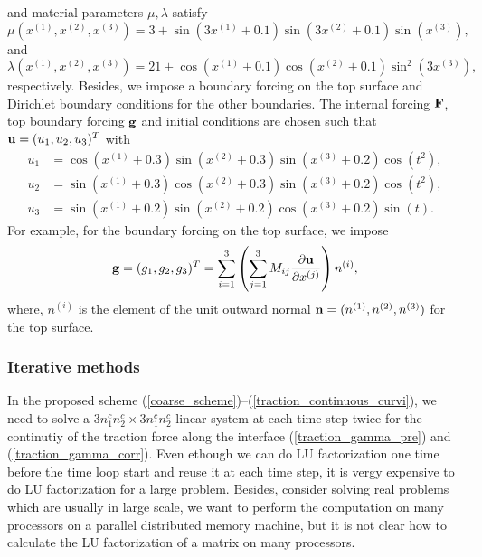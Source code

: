 \documentclass[a4paper]{article}
\begin{document}
and material parameters $\mu, \lambda$ satisfy
\begin{equation}\label{mu_function}
\mu(x^{(1)},x^{(2)},x^{(3)}) = 3 + \sin(3x^{(1)}+0.1)\sin(3x^{(2)}+0.1)\sin(x^{(3)}),
\end{equation}
and 
\begin{equation}\label{lambda_function}
\lambda(x^{(1)},x^{(2)},x^{(3)})  = 21+ \cos(x^{(1)}+0.1)\cos(x^{(2)}+0.1)\sin^2(3x^{(3)}),
\end{equation}
respectively. Besides, we impose a boundary forcing on the top surface and Dirichlet boundary conditions for the other boundaries. The internal forcing ${\bf F}$, top boundary forcing ${\bf g}$ and initial conditions are chosen such that ${\bf u} = (u_1,u_2,u_3)^T$ with
\begin{align*}
u_1 &= \cos(x^{(1)}+0.3)\sin(x^{(2)}+0.3)\sin(x^{(3)}+0.2)\cos(t^2),\\
u_2 &= \sin(x^{(1)}+0.3)\cos(x^{(2)}+0.3)\sin(x^{(3)}+0.2)\cos(t^2),\\
u_3 &= \sin(x^{(1)}+0.2)\sin(x^{(2)}+0.2)\cos(x^{(3)}+0.2)\sin(t).
\end{align*}
For example, for the boundary forcing on the top surface, we impose 
\begin{equation}\label{traction_force}
{\bf g} = (g_1,g_2,g_3)^T = \sum_{i=1}^3\left(\sum_{j = 1}^3 M_{ij}\frac{\partial{\bf u}}{\partial x^{(j)}}\right) n^{(i)},
\end{equation}
where, $n^{(i)}$ is the element of the unit outward normal ${\bf n} = (n^{(1)},n^{(2)},n^{(3)})$ for the top surface. 

\subsubsection{Iterative methods}\label{iterative_section}
In the proposed scheme (\ref{coarse_scheme})--(\ref{traction_continuous_curvi}), we need to solve a $3n_1^cn_2^c\times 3n_1^cn_2^c$ linear system at each time step twice for the continutiy of the traction force along the interface (\ref{traction_gamma_pre}) and (\ref{traction_gamma_corr}). Even ethough we can do LU factorization one time before the time loop start and reuse it at each time step, it is vergy expensive to do LU factorization for a large problem. Besides, consider solving real problems which are usually in large scale, we want to perform the computation on many processors on a parallel distributed memory machine, but it is not clear how to calculate the LU factorization of a matrix on many processors. 
\end{document}
